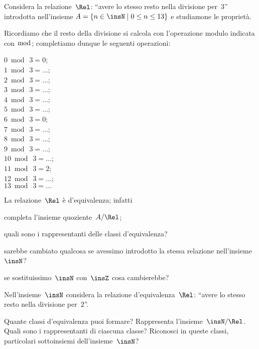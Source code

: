 \begin{exrig}
 \begin{esempio}
Considera la relazione~$\Rel$: ``avere lo stesso resto nella divisione per~$3$'' introdotta nell'insieme
$A=\{n\in \insN \mid  0\le n\le 13\}$ e studiamone le proprietà.

Ricordiamo che il resto della divisione si calcola con l'operazione modulo indicata con $\bmod$; completiamo dunque le seguenti operazioni:
\begin{multicols}{4}
\noindent $0 \bmod~3=0$;\\ $1 \bmod~3=\ldots$;\\ $2 \bmod~3=\ldots$;\\$3 \bmod~3=\ldots$;\\$4 \bmod~3=\ldots$;\\$5 \bmod~3=\ldots$;\\$6 \bmod~3=0$;\\
$7 \bmod~3=\ldots$;\\$8 \bmod~3=\ldots$;\\$9 \bmod~3=\ldots$;\\$10 \bmod~3=\ldots$;\\$11 \bmod~3=2$;\\$12 \bmod~3=\ldots$;\\$13 \bmod~3=\ldots$
\end{multicols}
\begin{itemize*}
 \item La relazione~$\Rel$ è d'equivalenza; infatti \dotfill
\item completa l'insieme quoziente~$A/\Rel$;
\item quali sono i rappresentanti delle classi d'equivalenza?
\item sarebbe cambiato qualcosa se avessimo introdotto la stessa relazione nell'insieme $\insN$?
\item se sostituissimo~$\insN$ con~$\insZ$ cosa cambierebbe?
\end{itemize*}
 \end{esempio}

 \begin{esempio}
Nell'insieme~$\insN$ considera la relazione d'equivalenza~$\Rel$: ``avere lo stesso resto nella divisione per~$2$''.

Quante classi d'equivalenza puoi formare? Rappresenta l'insieme~$\insN/\Rel$. Quali sono i rappresentanti di ciascuna classe?
Riconosci in queste classi, particolari sottoinsiemi dell'insieme~$\insN$?
 \end{esempio}
\end{exrig}


